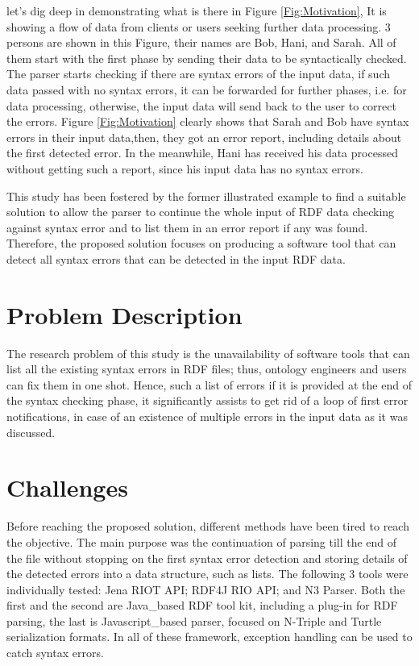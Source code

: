 let's dig deep in demonstrating what is there in  {Figure \ref{Fig:Motivation}}, It is showing a flow of data from clients or users seeking further data processing. 3 persons are shown in this Figure, their names are Bob, Hani, and Sarah. All of them start with the first phase by sending their data to be syntactically checked. The parser starts checking if there are syntax errors of the input data, if such data passed with no syntax errors, it can be forwarded for further phases, i.e. for data processing, otherwise, the input data will send back to the user to correct the errors. {Figure \ref{Fig:Motivation}} clearly shows that Sarah and Bob have syntax errors in their input data,then, they got an error report, including details about the first detected error. In the meanwhile, Hani has received his data processed without getting such a report, since his input data has no syntax errors. 

This study has been fostered by the former illustrated example to find a suitable solution to allow the parser to continue the whole input of RDF data checking against syntax error and to list them in an error report if any was found. Therefore, the proposed solution focuses on producing a software tool that can detect all syntax errors that can be detected in the input RDF data. 

\section{Problem Description } 	
The research problem of this study is the unavailability of software tools that can list all the existing syntax errors in RDF files; thus, ontology engineers and users can fix them in one shot. Hence, such a list of errors if it is provided at the end of the syntax checking phase, it significantly assists to get rid of a loop of first error notifications, in case of an existence of multiple errors  in the input data as it was discussed.  

\section{Challenges}
Before reaching the proposed solution, different methods have been tired to reach the objective. The main purpose was the continuation of parsing till the end of the file without stopping on the first syntax error detection  and storing details of the detected errors into a data structure, such as lists. The following 3 tools were individually tested: Jena RIOT API\cite{McBride:2002:JSW:613357.613755}; RDF4J RIO API\cite{RDF4J:Online}; and  N3 Parser\cite{N3Parser:Online}. Both the first and the second are Java\_based RDF tool kit, including a plug-in for RDF parsing, the last is Javascript\_based parser, focused on N-Triple and Turtle serialization formats. In all of these framework, exception handling can be used to catch syntax errors. 

